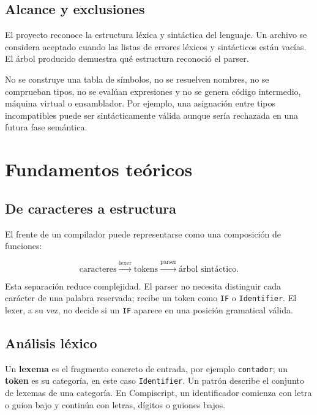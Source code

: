 \documentclass[12pt,letterpaper,oneside]{report}
\newcommand{\archivo}[1]{\texttt{#1}}
\begin{document}
\section{Alcance y exclusiones}

El proyecto reconoce la estructura léxica y sintáctica del lenguaje. Un archivo se
considera aceptado cuando las listas de errores léxicos y sintácticos están vacías.
El árbol producido demuestra qué estructura reconoció el parser.

No se construye una tabla de símbolos, no se resuelven nombres, no se comprueban
tipos, no se evalúan expresiones y no se genera código intermedio, máquina virtual o
ensamblador. Por ejemplo, una asignación entre tipos incompatibles puede ser
sintácticamente válida aunque sería rechazada en una futura fase semántica.

\chapter{Fundamentos teóricos}

\section{De caracteres a estructura}

El frente de un compilador puede representarse como una composición de funciones:

\[
  \text{caracteres}\xrightarrow{\text{lexer}}\text{tokens}
  \xrightarrow{\text{parser}}\text{árbol sintáctico}.
\]

Esta separación reduce complejidad. El parser no necesita distinguir cada carácter
de una palabra reservada; recibe un token como \archivo{IF} o \archivo{Identifier}.
El lexer, a su vez, no decide si un \archivo{IF} aparece en una posición gramatical
válida.

\section{Análisis léxico}

Un \textbf{lexema} es el fragmento concreto de entrada, por ejemplo
\archivo{contador}; un \textbf{token} es su categoría, en este caso
\archivo{Identifier}. Un patrón describe el conjunto de lexemas de una categoría.
En Compiscript, un identificador comienza con letra o guion bajo y continúa con
letras, dígitos o guiones bajos.
\end{document}
